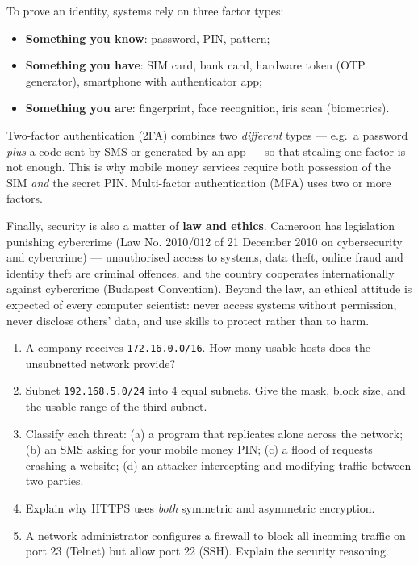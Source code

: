 \documentclass[11pt]{article}
\newcommand{\cle}[1]{{\popxbold\color{popdark}#1}}
\newcounter{popsec}
\newcounter{popsub}
\newcommand{\courssub}[1]{%
  \stepcounter{popsub}%
  \par\vspace{9pt}\noindent{\popxbold\fontsize{11.5}{13}\selectfont\color{popink}{\color{poporange}\thepopsec.\thepopsub}\hspace{6pt}#1}\par\nopagebreak\vspace{4pt}
}
\begin{document}
\courssub{Authentication and Legal Aspects}

To prove an identity, systems rely on three factor types:
\begin{itemize}
\item \textbf{Something you know}: password, PIN, pattern;
\item \textbf{Something you have}: SIM card, bank card, hardware token (OTP generator), smartphone with authenticator app;
\item \textbf{Something you are}: fingerprint, face recognition, iris scan (biometrics).
\end{itemize}
\cle{Two-factor authentication (2FA)} combines two \emph{different} types --- e.g.\ a password \emph{plus} a code sent by SMS or generated by an app --- so that stealing one factor is not enough. This is why mobile money services require both possession of the SIM \emph{and} the secret PIN. \cle{Multi-factor authentication (MFA)} uses two or more factors.

Finally, security is also a matter of \textbf{law and ethics}. Cameroon has legislation punishing cybercrime (Law No. 2010/012 of 21 December 2010 on cybersecurity and cybercrime) --- unauthorised access to systems, data theft, online fraud and identity theft are criminal offences, and the country cooperates internationally against cybercrime (Budapest Convention). Beyond the law, an ethical attitude is expected of every computer scientist: never access systems without permission, never disclose others' data, and use skills to protect rather than to harm.

\begin{exercice}
\begin{enumerate}
\item A company receives \texttt{172.16.0.0/16}. How many usable hosts does the unsubnetted network provide?
\item Subnet \texttt{192.168.5.0/24} into 4 equal subnets. Give the mask, block size, and the usable range of the third subnet.
\item Classify each threat: (a) a program that replicates alone across the network; (b) an SMS asking for your mobile money PIN; (c) a flood of requests crashing a website; (d) an attacker intercepting and modifying traffic between two parties.
\item Explain why HTTPS uses \emph{both} symmetric and asymmetric encryption.
\item A network administrator configures a firewall to block all incoming traffic on port 23 (Telnet) but allow port 22 (SSH). Explain the security reasoning.
\end{enumerate}
\end{exercice}
\end{document}

